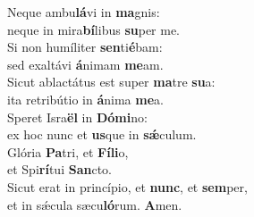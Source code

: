 \evenverse Neque ambu\textbf{lá}vi in \textbf{ma}gnis:~\*\\
\evenverse neque in mira\textbf{bí}libus \textbf{su}per me.\\
\oddverse Si non humíliter \textbf{sen}ti\textbf{é}bam:~\*\\
\oddverse sed exaltávi \textbf{á}nimam \textbf{me}am.\\
\evenverse Sicut ablactátus est super \textbf{ma}tre \textbf{su}a:~\*\\
\evenverse ita retribútio in \textbf{á}nima \textbf{me}a.\\
\oddverse Speret Isra\textbf{ël} in \textbf{Dó}\textbf{mi}no:~\*\\
\oddverse ex hoc nunc et \textbf{us}que in \textbf{sǽ}culum.\\
\evenverse Glória \textbf{Pa}tri, et \textbf{Fí}\textbf{li}o,~\*\\
\evenverse et Spi\textbf{rí}tui \textbf{San}cto.\\
\oddverse Sicut erat in princípio, et \textbf{nunc}, et \textbf{sem}per,~\*\\
\oddverse et in sǽcula sæcu\textbf{ló}rum. \textbf{A}men.\\
